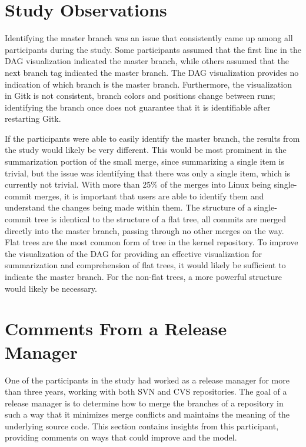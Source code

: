 \section{Study Observations}\label{sec:study_observations}

Identifying the master branch was an issue that consistently came up
among all participants during the study. Some participants assumed that
the first line in the DAG visualization indicated the master branch,
while others assumed that the next branch tag indicated the master
branch. The DAG visualization provides no indication of which branch is
the master branch. Furthermore, the visualization in Gitk is not
consistent, branch colors and positions change between runs; identifying
the branch once does not guarantee that it is identifiable after
restarting Gitk.

If the participants were able to easily identify the master branch, the
results from the study would likely be very different. This would be
most prominent in the summarization portion of the small merge, since
summarizing a single item is trivial, but the issue was identifying that
there was only a single item, which is currently not trivial. With more
than 25\% of the merges into Linux being single-commit merges, it is
important that users are able to identify them and understand the
changes being made within them. The structure of a single-commit tree is
identical to the structure of a flat tree, all commits are merged
directly into the master branch, passing through no other merges on the
way. Flat trees are the most common form of tree in the kernel
repository. To improve the visualization of the DAG for providing an
effective visualization for summarization and comprehension of flat
trees, it would likely be sufficient to indicate the master branch.
For the non-flat trees, a more powerful structure would likely be
necessary.

\section{Comments From a Release Manager}\label{sec:comments_from_a_release_manager}

One of the participants in the study had worked as a release manager for
more than three years, working with both SVN and CVS repositories. The
goal of a release manager is to determine how to merge the branches of a
repository in such a way that it minimizes merge conflicts and maintains
the meaning of the underlying source code. This section contains
insights from this participant, providing comments on ways that could
improve \tool{} and the \mt{} model.

